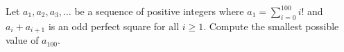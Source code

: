 Let $a_1, a_2, a_3, \dots$ be a sequence of positive integers where $a_1 = \sum_{i=0}^{100} i!$ and $a_i + a_{i+1}$ is an odd perfect square for all $i \ge 1$. Compute the smallest possible value of $a_{100}$.
